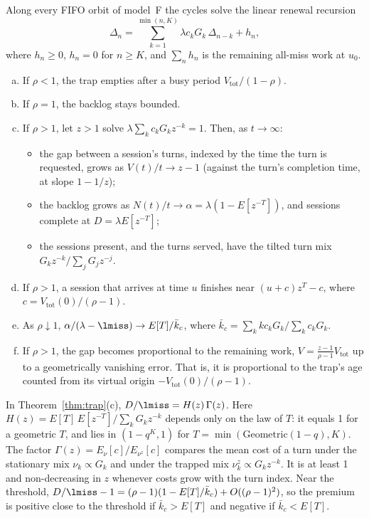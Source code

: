 \begin{theorem}\label{thm:trap}
Along every FIFO orbit of model~F the cycles solve the linear renewal recursion
\[
\Delta_n=\sum_{k=1}^{\min(n,K)}\lambda c_kG_k\,\Delta_{n-k}+h_n ,
\]
where $h_n\ge0$, $h_n=0$ for $n\ge K$, and $\sum_nh_n$ is the remaining all-miss work at $u_0$.
\begin{enumerate}[(a),leftmargin=*,nosep]
\item If $\rho<1$, the trap empties after a busy period $V_{\mathrm{tot}}/(1-\rho)$.
\item If $\rho=1$, the backlog stays bounded.
\item If $\rho>1$, let $z>1$ solve $\lambda\sum_kc_kG_kz^{-k}=1$. Then, as $t\to\infty$:
  \begin{itemize}[leftmargin=*,nosep]
  \item the gap between a session's turns, indexed by the time the turn is requested, grows as $V(t)/t\to z-1$ (against the
  turn's completion time, at slope $1-1/z$);
  \item the backlog grows as $N(t)/t\to\alpha=\lambda(1-E[z^{-T}])$, and sessions complete at $D=\lambda E[z^{-T}]$;
  \item the sessions present, and the turns served, have the tilted turn mix $G_kz^{-k}/\sum_jG_jz^{-j}$.
  \end{itemize}
\item If $\rho>1$, a session that arrives at time $u$ finishes near $(u+c)z^{T}-c$, where $c=V_{\mathrm{tot}}(0)/(\rho-1)$.
\item As $\rho\downarrow1$, $\alpha/(\lambda-\lmiss)\to E[T]/\bar k_c$, where $\bar k_c=\sum_kkc_kG_k/\sum_kc_kG_k$.
\item If $\rho>1$, the gap becomes proportional to the remaining work, $V=\frac{z-1}{\rho-1}V_{\mathrm{tot}}$ up to a
  geometrically vanishing error. That is, it is proportional to the trap's age counted from its virtual origin
  $-V_{\mathrm{tot}}(0)/(\rho-1)$.
\end{enumerate}
\end{theorem}

\begin{theorem}\label{thm:premium}
In Theorem~\ref{thm:trap}(c), $D/\lmiss=H(z)\,\Gamma(z)$. Here $H(z)=E[T]\,E[z^{-T}]/\sum_kG_kz^{-k}$ depends only on the law of
$T$: it equals 1 for a geometric $T$, and lies in $(1-q^K,1)$ for $T=\min(\mathrm{Geometric}(1-q),K)$. The factor
$\Gamma(z)=E_\nu[c]/E_{\nu^z}[c]$ compares the mean cost of a turn under the stationary mix $\nu_k\propto G_k$ and under the
trapped mix $\nu^z_k\propto G_kz^{-k}$. It is at least 1 and non-decreasing in $z$ whenever costs grow with the turn index.
Near the threshold, $D/\lmiss-1=(\rho-1)(1-E[T]/\bar k_c)+O((\rho-1)^2)$, so the premium is positive close to the threshold
if $\bar k_c>E[T]$ and negative if $\bar k_c<E[T]$.
\end{theorem}

